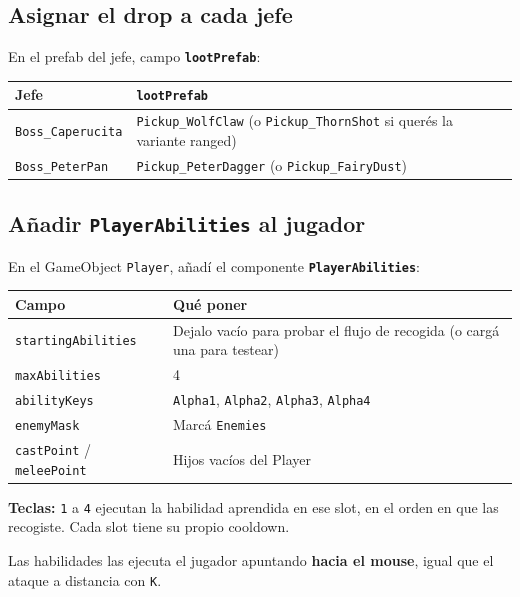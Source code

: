 \documentclass[a4paper,12pt]{article}
\newcommand{\code}[1]{\texttt{#1}}
\begin{document}
\subsection{Asignar el drop a cada jefe}

En el prefab del jefe, campo \textbf{\code{lootPrefab}}:

\begin{center}
\begin{tabular}{|l|l|}
\hline
\textbf{Jefe} & \textbf{\code{lootPrefab}} \\
\hline
\code{Boss\_Caperucita} & \code{Pickup\_WolfClaw} (o \code{Pickup\_ThornShot} si querés la variante ranged) \\
\hline
\code{Boss\_PeterPan} & \code{Pickup\_PeterDagger} (o \code{Pickup\_FairyDust}) \\
\hline
\end{tabular}
\end{center}

\subsection{Añadir \code{PlayerAbilities} al jugador}

En el GameObject \code{Player}, añadí el componente \textbf{\code{PlayerAbilities}}:

\begin{center}
\begin{tabular}{|l|p{8.4cm}|}
\hline
\textbf{Campo} & \textbf{Qué poner} \\
\hline
\code{startingAbilities} & Dejalo vacío para probar el flujo de recogida (o cargá una para testear) \\
\hline
\code{maxAbilities} & 4 \\
\hline
\code{abilityKeys} & \code{Alpha1}, \code{Alpha2}, \code{Alpha3}, \code{Alpha4} \\
\hline
\code{enemyMask} & Marcá \code{Enemies} \\
\hline
\code{castPoint} / \code{meleePoint} & Hijos vacíos del Player \\
\hline
\end{tabular}
\end{center}

\textbf{Teclas:} \code{1} a \code{4} ejecutan la habilidad aprendida en ese slot, en el orden en
que las recogiste. Cada slot tiene su propio cooldown.

Las habilidades las ejecuta el jugador apuntando \textbf{hacia el mouse}, igual que el ataque a
distancia con \code{K}.
\end{document}
